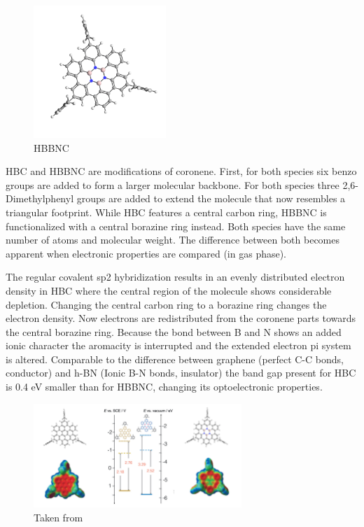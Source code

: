 \label{section_HBBNC}

\begin{figure}\centering
	\includegraphics[angle=90,width=5cm]{./images/molecules/max-zoom/HBBNC-600}
	\caption{HBBNC}
	\label{fig:HBBNC-molecule}
\end{figure}

HBC and HBBNC are modifications of coronene. First, for both species six benzo groups are added to form a larger molecular backbone. For both species three 2,6-Dimethylphenyl groups are added to extend the molecule that now resembles a triangular footprint. While HBC features a central carbon ring, HBBNC is functionalized with a central borazine ring instead.
Both species have the same number of atoms and molecular weight. The difference between both becomes apparent when electronic properties are compared (in gas phase).


The regular covalent sp2 hybridization results in an evenly distributed electron density in HBC where the central region of the molecule shows considerable depletion. Changing the central carbon ring to a borazine ring changes the electron density. Now electrons are redistributed from the coronene parts towards the central borazine ring. Because the bond between B and N shows an added ionic character the aromacity is interrupted and the extended electron pi system is altered. Comparable to the difference between graphene (perfect C-C bonds, conductor) and h-BN (Ionic B-N bonds, insulator) the band gap present for HBC is 0.4 eV smaller than for HBBNC, changing its optoelectronic properties.


\begin{figure}[]\centering
		\includegraphics[width=0.7\textwidth]{./images/dosso-combined}
	\caption{Taken from \cite{dosso_synthesis_2017}}
	\label{}
\end{figure}

